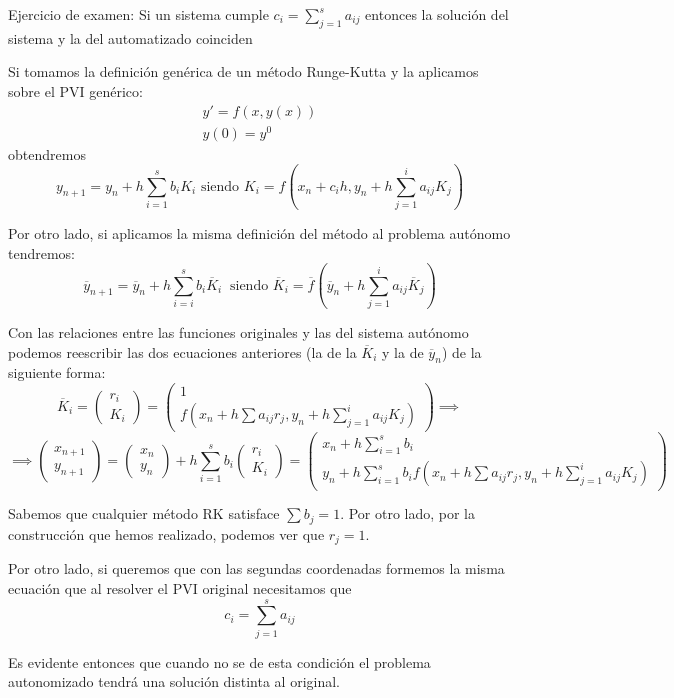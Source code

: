 \begin{problem}Ejercicio de examen: Si un sistema cumple $c_i = \sum_{j=1}^sa_{ij}$ entonces la solución del sistema y la del automatizado coinciden

\solution


Si tomamos la definición genérica de un método Runge-Kutta y la aplicamos sobre el PVI genérico:
\[\begin{array}{l}
y'=f(x,y(x))\\
y(0)=y^0
\end{array}\]
obtendremos
\[y_{n+1} = y_n+ h \sum_{i=1}^s b_i K_i \text{ siendo } K_i = f\left(x_n+c_ih, y_n+h \sum_{j=1}^ia_{ij}K_j\right)\]

Por otro lado, si aplicamos la misma definición del método al problema autónomo tendremos:
\[\overline{y}_{n+1}=\overline{y}_n+h\sum_{i=i}^sb_i\overline{K}_i\ \text{ siendo } \overline{K}_i = \overline{f}\left(\overline{y}_n+h\sum_{j=1}^ia_{ij}\overline{K}_j\right)\]

Con las relaciones entre las funciones originales y las del sistema autónomo podemos reescribir las dos ecuaciones anteriores (la de la $\overline{K}_i$ y la de $\overline{y}_n$) de la siguiente forma:
\small
\[\overline{K}_i = \left( \begin{array}{c} r_i \\ K_i \end{array}\right) = \left(\begin{array}{c} 1 \\ f\left(x_n+h\sum a_{ij}r_j, y_n+h \sum_{j=1}^ia_{ij}K_j\right)\end{array}\right) \implies \]
\[\implies \left( \begin{array}{c} x_{n+1} \\ y_{n+1}\end{array}\right) = \left( \begin{array}{c} x_n \\ y_n\end{array}\right) + h\sum_{i=1}^sb_i\left( \begin{array}{c} r_i \\ K_i\end{array}\right)=  \left(\begin{array}{c} x_n+h\sum_{i=1}^sb_i \\ y_n+h\sum_{i=1}^sb_if\left(x_n+h\sum a_{ij}r_j, y_n+h \sum_{j=1}^ia_{ij}K_j\right)\end{array}\right)\]
\normalsize

Sabemos que cualquier método RK satisface $\sum b_j=1$. Por otro lado, por la construcción que hemos realizado, podemos ver que $r_j=1$.

Por otro lado, si queremos que con las segundas coordenadas formemos la misma ecuación que al resolver el PVI original necesitamos que
\[c_i = \sum_{j=1}^s a_{ij}\]

Es evidente entonces que cuando no se de esta condición el problema autonomizado tendrá una solución distinta al original.


\end{problem}

